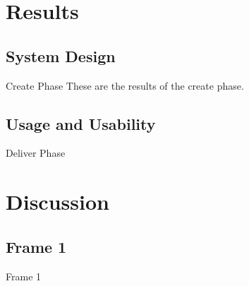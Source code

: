 \documentclass[xcolor=x11names,compress]{beamer}
\renewcommand{\(}{\begin{columns}}
\renewcommand{\)}{\end{columns}}
\newcommand{\<}[1]{\begin{column}{#1}}
\renewcommand{\>}{\end{column}}
\begin{document}
\section{Results}
\subsection{System Design}
\begin{frame}{Create Phase}
These are the results of the create phase.
\end{frame}

\subsection{Usage and Usability}
\begin{frame}{Deliver Phase}

\end{frame}

\section{Discussion}
\subsection{Frame 1}
\begin{frame}{Frame 1}

\end{frame}



\end{document}
